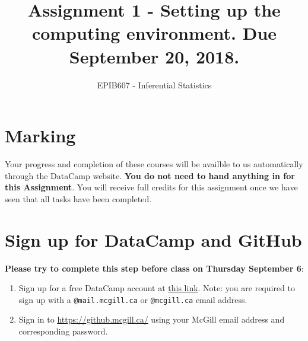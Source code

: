 \documentclass[letterpaper,9pt,twocolumn,twoside,printwatermark=false]{pinp}
\title{Assignment 1 - Setting up the computing environment. Due September 20,
2018.}
\author[a]{EPIB607 - Inferential Statistics}
\affil[a]{Fall 2018, McGill University}
\providecommand{\tightlist}{%
  \setlength{\itemsep}{0pt}\setlength{\parskip}{0pt}}
\begin{document}
\verticaladjustment{-2pt}

\maketitle
\thispagestyle{firststyle}



\section*{Marking}\label{marking}

Your progress and completion of these courses will be availble to us
automatically through the DataCamp website. \textbf{You do not need to
hand anything in for this Assignment}. You will receive full credits for
this assignment once we have seen that all tasks have been completed.

\section{Sign up for DataCamp and
GitHub}\label{sign-up-for-datacamp-and-github}

\textbf{Please try to complete this step before class on Thursday
September 6}:

\begin{enumerate}
\def\labelenumi{\arabic{enumi}.}
\tightlist
\item
  Sign up for a free DataCamp account at
  \href{https://www.datacamp.com/groups/shared_links/4c7d78a632b557dfdd6618b3e8fac09495571fec}{this
  link}. Note: you are required to sign up with a
  \texttt{@mail.mcgill.ca} or \texttt{@mcgill.ca} email address.\\
\item
  Sign in to \url{https://github.mcgill.ca/} using your McGill email
  address and corresponding password.
\end{enumerate}
\end{document}
